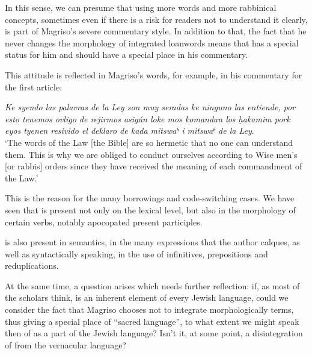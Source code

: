 \documentclass[output=paper,colorlinks,citecolor=brown,babel,arabicfont]{langscibook}
\begin{document}
In this sense, we can presume that using more  words and more rabbinical concepts, sometimes even if there is a risk for readers not to understand it clearly, is part of Magriso's severe commentary style. In addition to that, the fact that he never changes the morphology of integrated loanwords means that  has a special status for him and should have a special place in his commentary. 

This attitude is reflected in Magriso's words, for example, in his commentary for the first article:

\ea\label{ch3.7.ex.n60}
\textit{Ke syendo las palavras de la Ley son muy seradas ke ninguno las entiende, por esto tenemos ovligo de rejirmos asigún loke mos komandan los ḥakamim pork eyos tyenen resivido el deklaro de kada mitswaʰ i mitswaʰ de la Ley}. \\
`The words of the Law [the Bible] are so hermetic that no one can understand them. This is why we are obliged to conduct ourselves according to Wise men's [or rabbis] orders since they have received the meaning of each commandment of the Law.' 
\z

This is the reason for the many borrowings and code-switching cases. We have seen that  is present not only on the lexical level, but also in the morphology of certain verbs, notably apocopated present participles. 

 is also present in semantics, in the many expressions that the author calques, as well as syntactically speaking, in the use of infinitives, prepositions and reduplications. 

At the same time, a question arises which needs further reflection: if, as most of the  scholars think,  is an inherent element of every Jewish language, could we consider the fact that Magriso chooses not to integrate morphologically  terms, thus giving  a special place of ``sacred language'', to what extent we might speak then of  as a part of the Jewish language? Isn't it, at some point, a disintegration of  from the vernacular language? 


\sloppy
\printbibliography[heading=subbibliography,notkeyword=this]
\end{document}
